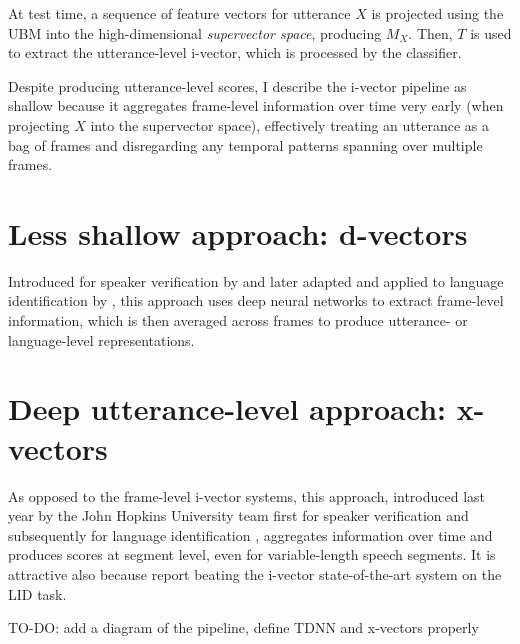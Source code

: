 \documentclass[bsc,frontabs,twoside,singlespacing,parskip,deptreport]{infthesis}
\begin{document}
{{    At test time, a sequence of feature vectors for utterance $X$ is projected using the UBM into the high-dimensional \textit{supervector space}, producing $M_X$. Then, $T$ is used to extract the utterance-level i-vector, which is processed by the classifier.

    Despite producing utterance-level scores, I describe the i-vector pipeline as shallow because it aggregates frame-level information over time very early (when projecting $X$ into the supervector space), effectively treating an utterance as a bag of frames and disregarding any temporal patterns spanning over multiple frames.
  }

  \section{Less shallow approach: d-vectors}{
    \label{sec:d-vectors}
    Introduced for speaker verification by \citet{Variani_et_al_2014} and later adapted and applied to language identification by \citet{dvectors_lid}, this approach uses deep neural networks to extract frame-level information, which is then averaged across frames to produce utterance- or language-level representations.
  }

  \section{Deep utterance-level approach: x-vectors}{
    \label{sec:x-vectors}
    As opposed to the frame-level i-vector systems, this approach, introduced last year by the John Hopkins University team first for speaker verification \citep{Snyder_et_al_2018b} and subsequently for language identification \citep{Snyder_et_al_2018}, aggregates information over time and produces scores at segment level, even for variable-length speech segments. It is attractive also because \citeauthor{Snyder_et_al_2018} report beating the i-vector state-of-the-art system on the LID task.

    TO-DO: add a diagram of the pipeline, define TDNN and x-vectors properly
    
}}
\end{document}
